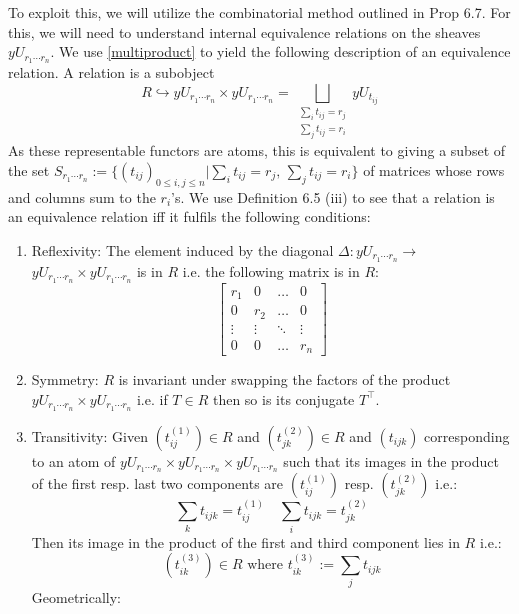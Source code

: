 \documentclass[a4paper]{amsproc}
\theoremstyle{plain}
\theoremstyle{definition}
\theoremstyle{remark}
\numberwithin{equation}{section}
\begin{document}
To exploit this, we will utilize the combinatorial method outlined in \cite{caramello_lafforgue} Prop 6.7. For this, we will need to understand internal equivalence relations on the sheaves $yU_{r_1\cdots r_n}$. We use \ref{multiproduct} to yield the following description of an equivalence relation. \newline
\indent A relation is a subobject 
\[R\hookrightarrow yU_{r_1\cdots r_n}\times yU_{r_1\cdots r_n}=\bigsqcup_{\substack{\sum_i t_{ij}=r_j \\ \sum_j t_{ij}=r_i}  }yU_{t_{ij}}\]
As these representable functors are atoms, this is equivalent to giving a subset of the set $S_{r_1\cdots r_n}:=\{(t_{ij})_{0\leq i,j \leq n} | \sum_i t_{ij}=r_j,\, \sum_j t_{ij}=r_i \}$ of matrices whose rows and columns sum to the $r_i$'s. We use Definition 6.5 (iii) \cite{caramello_lafforgue} to see that a relation is an equivalence relation iff it fulfils the following conditions:
\begin{enumerate}
\item Reflexivity:  The element induced by the diagonal $\Delta: yU_{r_1\cdots r_n}\rightarrow $\linebreak $ yU_{r_1\cdots r_n}\times yU_{r_1\cdots r_n}$ is in $R$ i.e. the following matrix is in $R$:
\[ \begin{bmatrix}
    r_{1}       & 0 & \dots & 0 \\
    0      & r_2 &  \dots &0 \\
    \vdots & \vdots &  \ddots& \vdots\\
    0       & 0& \dots & r_n
\end{bmatrix} \] 
\item Symmetry: $R$ is invariant under swapping the factors of the product $ yU_{r_1\cdots r_n}\times yU_{r_1\cdots r_n}$ i.e. if $T\in R$ then so is its conjugate $T^\top$.
\item Transitivity: Given $(t^{(1)}_{ij})\in R$ and $(t^{(2)}_{jk})\in R$ and $(t_{ijk})$ corresponding to an atom of $yU_{r_1\cdots r_n}\times yU_{r_1\cdots r_n} \times yU_{r_1\cdots r_n}$ such that its images in the product of the first resp. last two components are $(t^{(1)}_{ij})$ resp. $(t^{(2)}_{jk})$ i.e.:
\[\sum_k t_{ijk}=t^{(1)}_{ij} \quad \sum_i t_{ijk}=t^{(2)}_{jk} \]
Then its image in the product of the first and third component lies in $R$ i.e.:
\[(t^{(3)}_{ik})\in R \text{ where }t^{(3)}_{ik}:=\sum_j t_{ijk}    \]
Geometrically:
\end{enumerate}
\end{document}
